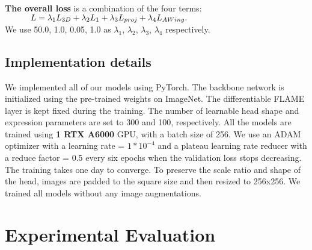 \documentclass[10pt,twocolumn,letterpaper]{article}
\begin{document}
\textbf{The overall loss} is a combination of the four terms:\\
$\text{\quad\quad\quad}L = \lambda_1 L_{3D} + \lambda_2 L_1 + \lambda_3 L_{proj} + \lambda_4 L_{AWing}.$\\
We use 50.0, 1.0, 0.05, 1.0 as $\lambda_1$, $\lambda_2$, $\lambda_3$, $\lambda_4$ respectively. 











\subsection{Implementation details}
We implemented all of our models using PyTorch. The backbone network is initialized using the pre-trained weights on ImageNet. The differentiable FLAME layer is kept fixed during the training. The number of learnable head shape and expression parameters are set to 300 and 100, respectively. All the models are trained using \textbf{1 RTX A6000} GPU, with a batch size of 256. We use an ADAM optimizer with a learning rate = $1 * 10^{-4}$ and a plateau learning rate reducer with a reduce factor = 0.5 every six epochs when the validation loss stops decreasing. The training takes one day to converge. To preserve the scale ratio and shape of the head, images are padded to the square size and then resized to 256x256. We trained all models without any image augmentations. 
 \section{Experimental Evaluation}
\end{document}
